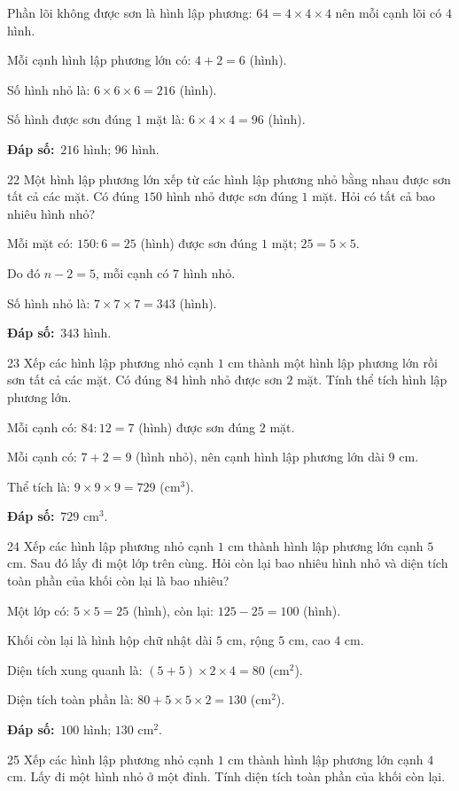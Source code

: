 \documentclass[11pt]{article}
\newif\ifsol \solfalse
\providecommand{\AnsWord}{Đáp số}
\newcommand{\dapso}[1]{\par\textbf{\AnsWord:}\ #1}
\newcommand{\probsol}[1]{%
  \begin{lrbox}{\solmeasure}\begin{minipage}{\dimexpr\linewidth-24pt\relax}#1\end{minipage}\end{lrbox}%
  \ifsol
    \begin{solbox}#1\end{solbox}%
  \else
    \setlength{\solht}{\dimexpr\ht\solmeasure+\dp\solmeasure+0.85cm\relax}%
    \ifdim\solht<1.35cm\setlength{\solht}{1.35cm}\fi
    \begin{tcolorbox}[colback=white,colframe=Line,boxrule=0.8pt,arc=5pt,
      left=8pt,right=8pt,top=4pt,bottom=4pt,height=\solht]{\footnotesize\color{Slate}\itshape\WorkWord}\end{tcolorbox}%
  \fi}
\newcommand{\gap}{\vspace{0.3cm}}
\def\WorkWord{Bài làm:}
\def\AnsWord{Đáp số}
\begin{document}
\probsol{
Phần lõi không được sơn là hình lập phương: $64=4\times4\times4$ nên mỗi cạnh lõi có $4$ hình.\par
Mỗi cạnh hình lập phương lớn có: $4+2=6$ (hình).\par
Số hình nhỏ là: $6\times6\times6=216$ (hình).\par
Số hình được sơn đúng $1$ mặt là: $6\times4\times4=96$ (hình).
\dapso{$216$ hình; $96$ hình.}}
\gap
\begin{probbox}{22}{\relax}
Một hình lập phương lớn xếp từ các hình lập phương nhỏ bằng nhau được sơn tất cả các mặt. Có đúng $150$ hình nhỏ được sơn đúng $1$ mặt. Hỏi có tất cả bao nhiêu hình nhỏ?
\end{probbox}
\probsol{
Mỗi mặt có: $150:6=25$ (hình) được sơn đúng $1$ mặt; $25=5\times5$.\par
Do đó $n-2=5$, mỗi cạnh có $7$ hình nhỏ.\par
Số hình nhỏ là: $7\times7\times7=343$ (hình).
\dapso{$343$ hình.}}
\gap
\begin{probbox}{23}{\relax}
Xếp các hình lập phương nhỏ cạnh $1$ cm thành một hình lập phương lớn rồi sơn tất cả các mặt. Có đúng $84$ hình nhỏ được sơn $2$ mặt. Tính thể tích hình lập phương lớn.
\end{probbox}
\probsol{
Mỗi cạnh có: $84:12=7$ (hình) được sơn đúng $2$ mặt.\par
Mỗi cạnh có: $7+2=9$ (hình nhỏ), nên cạnh hình lập phương lớn dài $9$ cm.\par
Thể tích là: $9\times9\times9=729$ (cm$^3$).
\dapso{$729$ cm$^3$.}}
\gap
\begin{probbox}{24}{\relax}
Xếp các hình lập phương nhỏ cạnh $1$ cm thành hình lập phương lớn cạnh $5$ cm. Sau đó lấy đi một lớp trên cùng. Hỏi còn lại bao nhiêu hình nhỏ và diện tích toàn phần của khối còn lại là bao nhiêu?
\end{probbox}
\probsol{
Một lớp có: $5\times5=25$ (hình), còn lại: $125-25=100$ (hình).\par
Khối còn lại là hình hộp chữ nhật dài $5$ cm, rộng $5$ cm, cao $4$ cm.\par
Diện tích xung quanh là: $(5+5)\times2\times4=80$ (cm$^2$).\par
Diện tích toàn phần là: $80+5\times5\times2=130$ (cm$^2$).
\dapso{$100$ hình; $130$ cm$^2$.}}
\gap
\begin{probbox}{25}{\relax}
Xếp các hình lập phương nhỏ cạnh $1$ cm thành hình lập phương lớn cạnh $4$ cm. Lấy đi một hình nhỏ ở một đỉnh. Tính diện tích toàn phần của khối còn lại.
\end{probbox}
\end{document}
